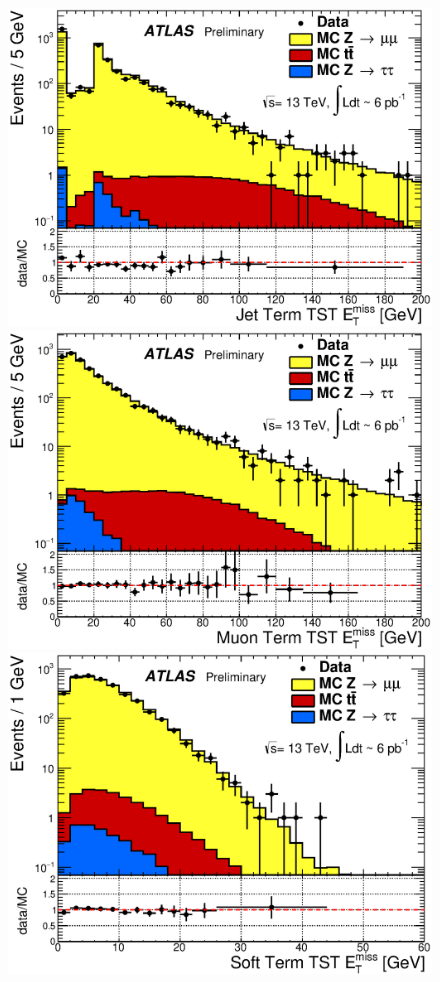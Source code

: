 \begin{centering}
\begin{figure}[!hbt]
\myfloatalign
\includegraphics[width=.9\linewidth]{figures/reco/met_fig_02a.eps}
\includegraphics[width=.9\linewidth]{figures/reco/met_fig_02b.eps}
\includegraphics[width=.9\linewidth]{figures/reco/met_fig_02c.eps}

\end{figure}
\end{centering}
